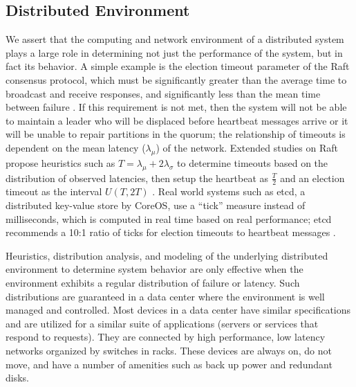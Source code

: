 \documentclass[letterpaper,twocolumn,10pt]{article}
\begin{document}
\subsection{Distributed Environment}

We assert that the computing and network environment of a distributed system plays a large role in determining not just the performance of the system, but in fact its behavior. A simple example is the election timeout parameter of the Raft consensus protocol, which must be significantly greater than the average time to broadcast and receive responses, and significantly less than the mean time between failure \cite{ongaro_search_2013}. If this requirement is not met, then the system will not be able to maintain a leader who will be displaced before heartbeat messages arrive or it will be unable to repair partitions in the quorum; the relationship of timeouts is dependent on the mean latency ($\lambda_{\mu}$) of the network. Extended studies on Raft propose heuristics such as $T = \lambda_{\mu} + 2\lambda_{\sigma}$ to determine timeouts based on the distribution of observed latencies, then setup the heartbeat as $\frac {T} {2}$ and an election timeout as the interval $U(T,2T)$ \cite{howard_raft_2015}. Real world systems such as etcd, a distributed key-value store by CoreOS, use a ``tick'' measure instead of milliseconds, which is computed in real time based on real performance; etcd recommends a 10:1 ratio of ticks for election timeouts to heartbeat messages \cite{mizerany_etcd_2016}.


Heuristics, distribution analysis, and modeling of the underlying distributed environment to determine system behavior are only effective when the environment exhibits a regular distribution of failure or latency. Such distributions are guaranteed in a data center where the environment is well managed and controlled. Most devices in a data center have similar specifications and are utilized for a similar suite of applications (servers or services that respond to requests). They are connected by high performance, low latency networks organized by switches in racks. These devices are always on, do not move, and have a number of amenities such as back up power and redundant disks.
\end{document}
